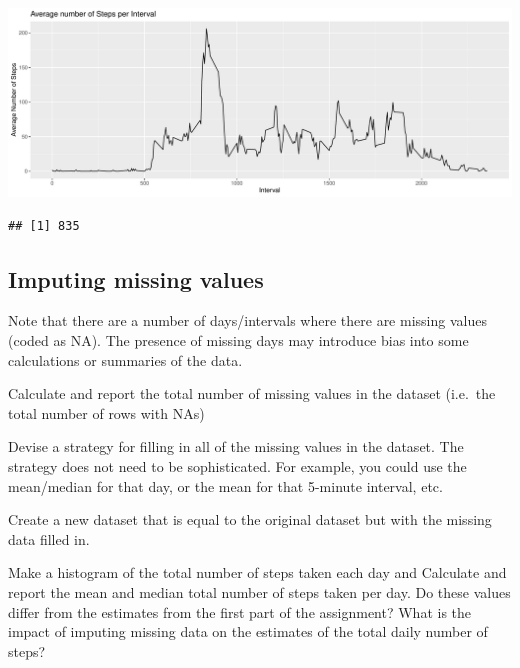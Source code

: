 \documentclass[
]{article}
\newenvironment{Shaded}{\begin{snugshade}}{\end{snugshade}}
\newcommand{\DecValTok}[1]{\textcolor[rgb]{0.00,0.00,0.81}{#1}}
\newcommand{\DocumentationTok}[1]{\textcolor[rgb]{0.56,0.35,0.01}{\textbf{\textit{#1}}}}
\newcommand{\FunctionTok}[1]{\textcolor[rgb]{0.00,0.00,0.00}{#1}}
\newcommand{\NormalTok}[1]{#1}
\newcommand{\OtherTok}[1]{\textcolor[rgb]{0.56,0.35,0.01}{#1}}
\newcommand{\SpecialCharTok}[1]{\textcolor[rgb]{0.00,0.00,0.00}{#1}}
\begin{document}
\includegraphics{project_1_files/figure-latex/daily-1.pdf}

\begin{Shaded}
\end{Shaded}

\begin{verbatim}
## [1] 835
\end{verbatim}

\hypertarget{imputing-missing-values}{%
\subsection{Imputing missing values}\label{imputing-missing-values}}

Note that there are a number of days/intervals where there are missing
values (coded as \color{red}{\verb|NA|}NA). The presence of missing days
may introduce bias into some calculations or summaries of the data.

Calculate and report the total number of missing values in the dataset
(i.e.~the total number of rows with \color{red}{\verb|NA|}NAs)

Devise a strategy for filling in all of the missing values in the
dataset. The strategy does not need to be sophisticated. For example,
you could use the mean/median for that day, or the mean for that
5-minute interval, etc.

Create a new dataset that is equal to the original dataset but with the
missing data filled in.

Make a histogram of the total number of steps taken each day and
Calculate and report the mean and median total number of steps taken per
day. Do these values differ from the estimates from the first part of
the assignment? What is the impact of imputing missing data on the
estimates of the total daily number of steps?
\end{document}
